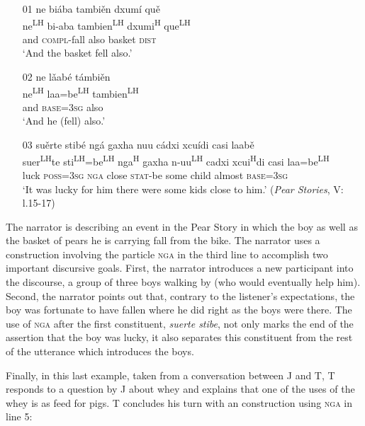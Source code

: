 \ea\label{nga}
\begin{itemize}
\item[01]
\glll ne bi\'{a}ba tambi\v{e}n dxum\'{i} qu\v{e} \\
ne\textsuperscript{LH} bi-aba tambien\textsuperscript{LH} dxumi\textsuperscript{H} que\textsuperscript{LH} \\
and \textsc{compl}-fall also basket \textsc{dist} \\
\glt `And the basket fell also.'


\item[02]
\glll ne l\v{a}ab\'{e} t\'{a}mbi\v{e}n \\
ne\textsuperscript{LH} laa=be\textsuperscript{LH} tambien\textsuperscript{LH} \\
and \textsc{base}=3\textsc{sg} also \\
\glt `And he (fell) also.' 


\item[03]
\glll su\v{e}rte stib\'{e} ng\'{a} gaxha nuu c\'{a}dxi xcu\'{i}di casi laab\v{e}  \\
suer\textsuperscript{LH}te sti\textsuperscript{LH}=be\textsuperscript{LH} nga\textsuperscript{H} gaxha n-uu\textsuperscript{LH} cadxi xcui\textsuperscript{H}di casi laa=be\textsuperscript{LH}  \\
luck \textsc{poss}=3\textsc{sg} \textsc{nga} close \textsc{stat}-be some child almost \textsc{base}=3\textsc{sg}  \\
\glt `It was lucky for him there were some kids close to him.' \hfill (\textit{Pear Stories}, V: l.15-17)

\end{itemize}
\z
The narrator is describing an event in the Pear Story in which the boy as well as the basket of pears he is carrying fall from the bike. The narrator uses a construction involving the particle \textsc{nga} in the third line to accomplish two important discursive goals. First, the narrator introduces a new participant into the discourse, a group of three boys walking by (who would eventually help him). Second, the narrator points out that, contrary to the listener's expectations, the boy was fortunate to have fallen where he did right as the boys were there. The use of \textsc{nga} after the first constituent, \textit{suerte stibe}, not only marks the end of the assertion that the boy was lucky, it also separates this constituent from the rest of the utterance which introduces the boys. 

Finally, in this last example, taken from a conversation between J and T, T responds to a question by J about whey and explains that one of the uses of the whey is as feed for pigs. T concludes his turn with an  construction using \textsc{nga} in line 5:

